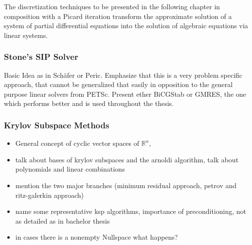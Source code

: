         The discretization techniques to be presented in the following chapter in composition with a Picard iteration transform the approximate solution of a system of partial differential equations into the solution of algebraic equations via linear systems.

       \subsubsection{Stone's SIP Solver}

         Basic Idea as in Schäfer or Peric. Emphasize that this is a very problem specific approach, that cannot be generalized that easily in opposition to the general purpose linear solvers from PETSc. Present ether BiCGStab or GMRES, the one which performs better and is used throughout the thesis.

       \subsubsection{Krylov Subspace Methods}
        \begin{itemize}
          \item General concept of cyclic vector spaces of \(\mathbb{R}^n\), 
          \item talk about bases of krylov subspaces and the arnoldi algorithm, talk about polynomials and linear combinations
          \item mention the two major branches (minimum residual approach, petrov and ritz-galerkin approach) 
          \item name some representative ksp algorithms, importance of preconditioning, not as detailed as in bachelor thesis
          \item in cases there is a nonempty Nullspace what happens?
        \end{itemize}

